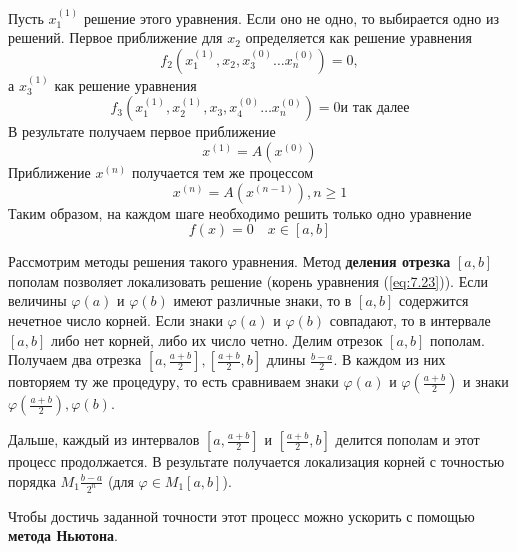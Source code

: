 Пусть $x_1^{(1)}$ решение этого уравнения. Если оно не одно, то выбирается одно из решений. Первое приближение для $x_2$ определяется как решение уравнения
\begin{equation} \label{eq:7.19}
	f_2(x_1^{(1)}, x_2, x_3^{(0)} \dots x_n^{(0)}) = 0,
\end{equation} 
а $x_3^{(1)}$ как решение уравнения
\begin{equation} \label{eq:7.20}
	f_3(x_1^{(1)}, x_2^{(1)}, x_3, x_4^{(0)} \dots x_n^{(0)}) = 0 \textrm{и так далее}
\end{equation} 
В результате получаем первое приближение
\begin{equation} \label{eq:7.21}
	x^{(1)} = A(x^{(0)})
\end{equation} 
Приближение $x^{(n)}$ получается тем же процессом
\begin{equation} \label{eq:7.22}
	x^{(n)} = A(x^{(n-1)}), n \geq 1
\end{equation} 
Таким образом, на каждом шаге необходимо решить только одно уравнение
\begin{equation} \label{eq:7.23}
	f(x) = 0 \quad x \in [a, b]
\end{equation} 

Рассмотрим методы решения такого уравнения. Метод \textbf{деления отрезка} $[a, b]$ пополам позволяет локализовать решение (корень уравнения (\ref{eq:7.23})). Если величины $\varphi(a)$ и $\varphi(b)$ имеют различные знаки, то в $[a, b]$ содержится нечетное число корней. Если знаки $\varphi(a)$ и $\varphi(b)$ совпадают, то в интервале $[a, b]$ либо нет корней, либо их число четно. Делим отрезок $[a, b]$ пополам. Получаем два отрезка $[a, \frac{a+b}{2}], [\frac{a+b}{2}, b]$ длины $\frac{b-a}{2}$. В каждом из них повторяем ту же процедуру, то есть сравниваем знаки $\varphi(a)$ и $\varphi(\frac{a+b}{2})$ и знаки $\varphi(\frac{a+b}{2}), \varphi(b)$.

Дальше, каждый из интервалов $[a, \frac{a+b}{2}]$ и $[\frac{a+b}{2}, b]$ делится пополам и этот процесс продолжается. В результате получается локализация корней с точностью порядка $M_1 \frac{b-a}{2^n}$ (для $\varphi \in M_1[a, b]$). 

Чтобы достичь заданной точности этот процесс можно ускорить с помощью \textbf{метода Ньютона}.


